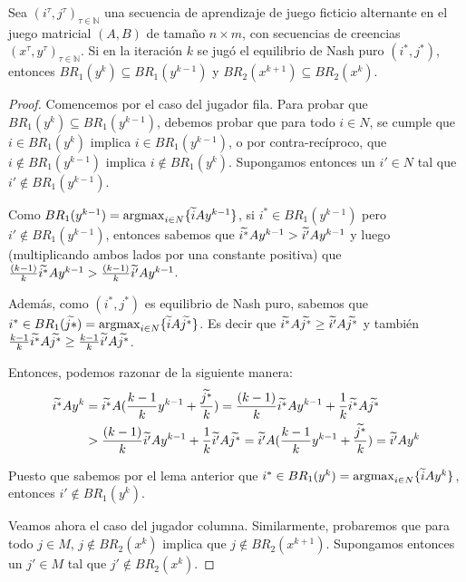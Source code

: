 \begin{lemma}
    Sea $(i^\tau, j^\tau)_{\tau \in \mathbb{N}}$ una secuencia de aprendizaje de juego ficticio alternante en el juego matricial $(A, B)$ de tamaño $n \times m$, con secuencias de creencias $(x^\tau, y^\tau)_{\tau \in \mathbb{N}}$. Si en la iteración $k$ se jugó el equilibrio de Nash puro $(i^*, j^*)$, entonces $BR_1(y^{k}) \subseteq BR_1(y^{k-1})$ y $BR_2(x^{k+1}) \subseteq BR_2(x^{k})$.
\end{lemma}
\begin{proof}
    Comencemos por el caso del jugador fila. Para probar que $BR_1(y^{k}) \subseteq BR_1(y^{k-1})$, debemos probar que para todo $i \in N$, se cumple que $i \in BR_1(y^{k})$ implica $i \in BR_1(y^{k-1})$, o por contra-recíproco, que $i \notin BR_1(y^{k-1})$ implica $i \notin BR_1(y^{k})$. Supongamos entonces un $i' \in N$ tal que $i' \notin BR_1(y^{k-1})$.

    Como $BR_1(y^{k-1}) = \operatorname*{argmax}_{i \in N} \{\widetilde{i}Ay^{k-1}\}$, si $i^* \in BR_1(y^{k-1})$ pero $i' \notin BR_1(y^{k-1})$, entonces sabemos que $\widetilde{i^*}Ay^{k-1} > \widetilde{i'}Ay^{k-1}$ y luego (multiplicando ambos lados por una constante positiva) que $\frac{(k - 1)}{k} \widetilde{i^*}Ay^{k-1} > \frac{(k - 1)}{k} \widetilde{i'}Ay^{k-1}$.
    
    Además, como $(i^*, j^*)$ es equilibrio de Nash puro, sabemos que $i^* \in BR_1(\widetilde{j*}) = \operatorname*{argmax}_{i \in N} \{\widetilde{i}A\widetilde{j^*}\}$. Es decir que $\widetilde{i^*}A\widetilde{j^*} \ge \widetilde{i'}A\widetilde{j^*}$ y también $\frac{k - 1}{k} \widetilde{i^*}A\widetilde{j^*} \ge \frac{k - 1}{k} \widetilde{i'}A\widetilde{j^*}$.

    Entonces, podemos razonar de la siguiente manera:
    \begin{align*}
        \widetilde{i^*}Ay^k &= \widetilde{i^*}A(\frac{k - 1}{k} y^{k-1} + \frac{\widetilde{j^*}}{k}) = \frac{(k - 1)}{k} \widetilde{i^*}Ay^{k-1} + \frac{1}{k}\widetilde{i^*}A\widetilde{j^*}\\
        &> \frac{(k - 1)}{k} \widetilde{i'}Ay^{k-1} + \frac{1}{k}\widetilde{i'}A\widetilde{j^*} = \widetilde{i'}A(\frac{k - 1}{k} y^{k-1} + \frac{\widetilde{j^*}}{k}) = \widetilde{i'}Ay^k
    \end{align*}

    Puesto que sabemos por el lema anterior que $i^* \in BR_1(y^{k}) = \operatorname*{argmax}_{i \in N} \{\widetilde{i}Ay^{k}\}$, entonces $i' \notin BR_1(y^{k})$.
    
    Veamos ahora el caso del jugador columna. Similarmente, probaremos que para todo $j \in M$, $ j \notin BR_2(x^k)$ implica que $j \notin BR_2(x^{k+1})$. Supongamos entonces un $j' \in M$ tal que $j' \notin BR_2(x^k)$.


\end{proof}
